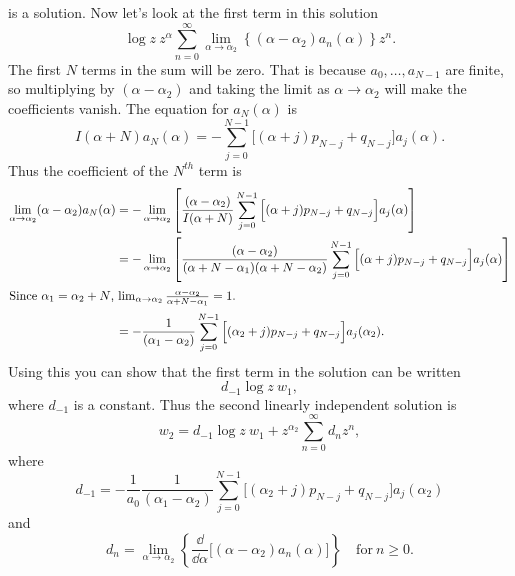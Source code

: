 is a solution.
Now let's look at the first term in this solution
\[ \log z\ z^\alpha \sum_{n=0}^\infty \lim_{\alpha \to \alpha_2}
\left\{ (\alpha-\alpha_2)a_n(\alpha) \right\} z^n. \]
The first $N$ terms in the sum will be zero.   
That is because $a_0, \ldots, a_{N-1}$ are finite, so multiplying by 
$(\alpha-\alpha_2)$ and taking the limit as $\alpha \to \alpha_2$ will make
the coefficients vanish.
The equation for $a_N(\alpha)$ is
\[ I(\alpha + N) a_N(\alpha) 
= - \sum_{j=0}^{N-1} \Big[(\alpha+j)p_{N-j} + q_{N-j}\Big]a_j(\alpha). \]
Thus the coefficient of the $N^{t h}$ term is
\begin{align*}
  \lim_{\alpha \to \alpha_2}(\alpha-\alpha_2)a_N(\alpha)
  &= -\lim_{\alpha \to \alpha_2} \left[ \frac{(\alpha-\alpha_2)}
    {I(\alpha+N)}\sum_{j=0}^{N-1} 
    \Big[(\alpha+j)p_{N-j} + q_{N-j}\Big]a_j(\alpha) \right]\\
  &= -\lim_{\alpha \to \alpha_2} \left[ \frac{(\alpha-\alpha_2)}
    {(\alpha + N - \alpha_1)(\alpha+N-\alpha_2)}\sum_{j=0}^{N-1} 
    \Big[(\alpha+j)p_{N-j} + q_{N-j}\Big]a_j(\alpha) \right]\\
  \intertext{Since $\alpha_1 = \alpha_2 + N$, $\lim_{\alpha \to \alpha_2} 
    \frac{\alpha-\alpha_2}{\alpha+N-\alpha_1} = 1$.}
  &= -\frac{1}{(\alpha_1 - \alpha_2)}\sum_{j=0}^{N-1} 
  \Big[(\alpha_2+j)p_{N-j} + q_{N-j}\Big]a_j(\alpha_2) .
\end{align*}
Using this you can show that the first term in the solution can be written
\[ d_{-1} \log z\ w_1, \]
where $d_{-1}$ is a constant.
Thus the second linearly independent solution is
\[ \boxed{ w_2 = d_{-1} \log z\ w_1 + 
  z^{\alpha_2} \sum_{n=0}^\infty d_n z^n, } \]
where
\[ d_{-1} = - \frac{1}{a_0} 
\frac{1}{(\alpha_1 - \alpha_2)}\sum_{j=0}^{N-1}
\Big[(\alpha_2+j)p_{N-j} + q_{N-j}\Big]a_j(\alpha_2) \]
and
\[ d_n = \lim_{\alpha \to \alpha_2} \left\{
  \frac{\dd}{\dd \alpha} \Big[(\alpha-\alpha_2)a_n(\alpha)\Big] \right\} 
\quad \mathrm{for}\ n \geq 0. \]













